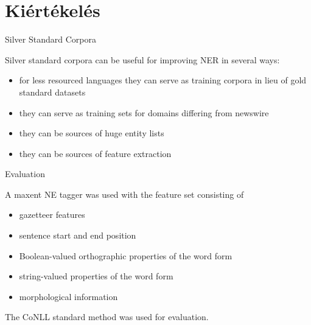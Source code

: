 \documentclass[utf8x,t]{beamer}
\newcommand{\vitem}{\item \vspace{4pt}}
\begin{document}
\section{Kiértékelés}

\begin{frame}{Silver Standard Corpora}

\bigskip

Silver standard corpora can be useful for improving NER in several ways:

\smallskip

\begin{itemize}
\vitem for less resourced languages they can serve as training corpora in lieu of gold standard datasets
\vitem they can serve as training sets for domains differing from newswire
\vitem they can be sources of huge entity lists
\vitem they can be sources of feature extraction
\end{itemize}

\end{frame}

\begin{frame}{Evaluation}

\bigskip

A maxent NE tagger was used with the feature set consisting of

\smallskip

\begin{itemize}
\vitem gazetteer features
\vitem sentence start and end position
\vitem Boolean-valued orthographic properties of the word form
\vitem string-valued properties of the word form
\vitem morphological information
\end{itemize}

\bigskip

The CoNLL standard method was used for evaluation.

\end{frame}
\end{document}
